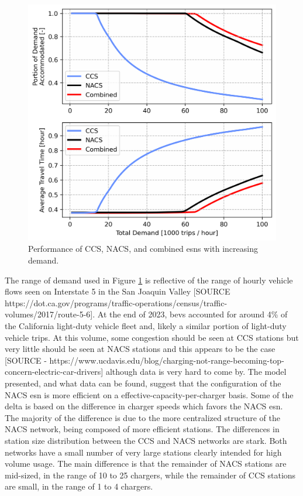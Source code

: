 \begin{figure}[H]
	\centering
	\includegraphics[width = \linewidth]{./figures/esn_performance.png}
	\caption{Performance of CCS, NACS, and combined \glspl{esn} with increasing demand.}
	\label{fig:esn_performance}
\end{figure}

The range of demand used in Figure \ref{fig:esn_performance} is reflective of the range of hourly vehicle flows seen on Interstate 5 in the San Joaquin Valley [SOURCE https://dot.ca.gov/programs/traffic-operations/census/traffic-volumes/2017/route-5-6]. At the end of 2023, \glspl{bev} accounted for around 4\% of the California light-duty vehicle fleet \citep{cec_2024} and, likely a similar portion of light-duty vehicle trips. At this volume, some congestion should be seen at CCS stations but very little should be seen at NACS stations and this appears to be the case [SOURCE - https://www.ucdavis.edu/blog/charging-not-range-becoming-top-concern-electric-car-drivers] although data is very hard to come by. The model presented, and what data can be found, suggest that the configuration of the NACS \gls{esn} is more efficient on a effective-capacity-per-charger basis. Some of the delta is based on the difference in charger speeds which favors the NACS \gls{esn}. The majority of the difference is due to the more centralized structure of the NACS network, being composed of more efficient stations. The differences in station size distribution between the CCS and NACS networks are stark. Both networks have a small number of very large stations clearly intended for high volume usage. The main difference is that the remainder of NACS stations are mid-sized, in the range of 10 to 25 chargers, while the remainder of CCS stations are small, in the range of 1 to 4 chargers.

